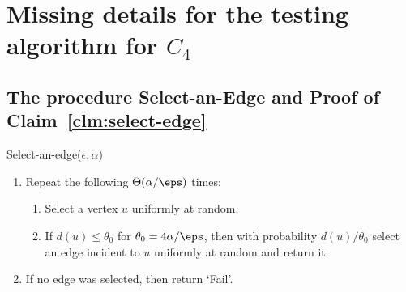 \documentclass{article}
\begin{document}













\appendix

\section{Missing details for the testing algorithm for $C_4$}\label{sec:4.1}
 
\subsection{The procedure \textsf{Select-an-Edge} and Proof of Claim~\ref{clm:select-edge}} \label{append:sample-edge}
\textsf{Select-an-edge}($\epsilon,\alpha$)\label{alg:select-edge}
\begin{enumerate}
\item Repeat the following $\Theta(\alpha/\eps)$ times:
\begin{enumerate}
  \item Select a vertex $u$ uniformly at random.
  \item If $d(u) \leq \theta_0$ for $\theta_0=4\alpha/\eps$, then with probability $d(u)/\theta_0$ select an edge incident to $u$ uniformly at random and return it. 
\end{enumerate}
\item If no edge was selected, then return `Fail'.
\end{enumerate}
\end{document}
